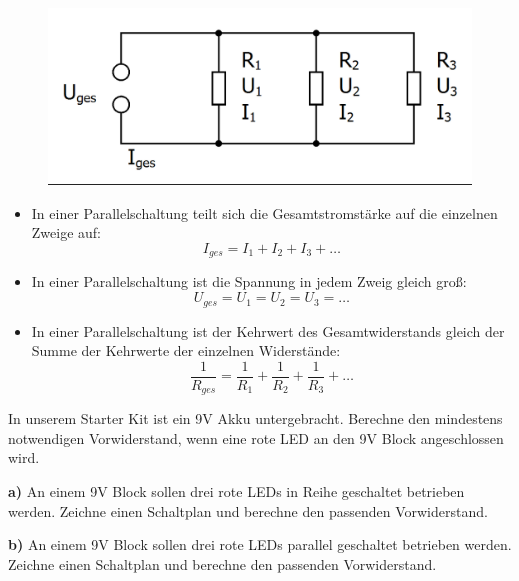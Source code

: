 \begin{tcolorbox}[equal height group=A,enhanced, colback=CadetBlue!70!green, coltext=black, colframe=DarkCyan!70!DarkGreen, width=0.48\textwidth, before=, after=\hfill, adjusted title={Elektrische Stromstärke und Spannung in der Parallelschaltung}, colbacktitle=CadetBlue!70!green, coltitle=black,fonttitle=\bfseries]
	\begin{figure}[H]
		\centering
		\includegraphics[width=\textwidth]{./Zeichnungen/parallelschaltung.png}
	\end{figure}
	\begin{itemize}[parsep=0ex,itemsep=0ex,leftmargin=*]
		\item In einer Parallelschaltung teilt sich die Gesamtstromstärke auf die einzelnen Zweige auf:
		\begin{equation*}
			I_{ges}=I_1+I_2+ I_3+\dots
		\end{equation*}
		\item In einer Parallelschaltung ist die Spannung in jedem Zweig gleich groß:
		\begin{equation*}
			U_{ges}=U_1=U_2=U_3=\dots
		\end{equation*}
		\item In einer Parallelschaltung ist der Kehrwert des Gesamtwiderstands gleich der Summe der Kehrwerte der einzelnen Widerstände:
		\begin{equation*}
			\frac{1}{R_{ges}} = \frac{1}{R_1} + \frac{1}{R_2} + \frac{1}{R_3} + \dots
		\end{equation*}
	\end{itemize}
\end{tcolorbox}

\begin{aufgabe}
	In unserem Starter Kit ist ein 9V Akku untergebracht. Berechne den mindestens notwendigen Vorwiderstand, wenn eine
	rote LED an den 9V Block angeschlossen wird.
\end{aufgabe}

\begin{aufgabe}
	\smallbreak
	\textbf{a)} An einem 9V Block sollen drei rote LEDs in Reihe geschaltet betrieben werden. Zeichne einen Schaltplan und berechne den passenden Vorwiderstand.
	
	\textbf{b)} An einem 9V Block sollen drei rote LEDs parallel geschaltet betrieben werden. Zeichne einen Schaltplan und berechne den passenden Vorwiderstand.
\end{aufgabe}
\vfill

